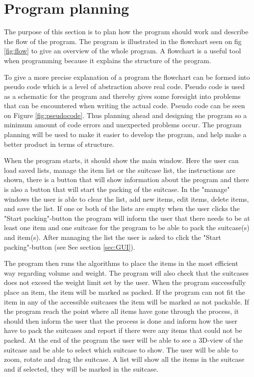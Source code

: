 \section{Program planning}
The purpose of this section is to plan how the program should work and describe the flow of the program. The program is illustrated in the flowchart seen on fig \ref{fig:flow} to give an overview of the whole program. A flowchart is a useful tool when programming because it explains the structure of the program.

To give a more precise explanation of a program the flowchart can be formed into pseudo code which is a level of abstraction above real code. Pseudo code is used as a schematic for the program and thereby gives some foresight into problems that can be encountered when writing the actual code. Pseudo code can be seen on Figure \ref{fig:pseudocode}.
Thus planning ahead and designing the program so a minimum amount of code errors and unexpected problems occur. The program planning will be used to make it easier to develop the program, and help make a better product in terms of structure.

When the program starts, it should show the main window. Here the user can load saved lists, manage the item list or the suitcase list, the instructions are shown, there is a button that will show information about the program and there is also a button that will start the packing of the suitcase. In the "manage" windows the user is able to clear the list, add new items, edit items, delete items, and save the list. If one or both of the lists are empty when the user clicks the "Start packing"-button the program will inform the user that there needs to be at least one item and one suitcase for the program to be able to pack the suitcase(s) and item(s). After managing the list the user is asked to click the "Start packing"-button (see See section \ref{sec:GUI}).

The program then runs the algorithms to place the items in the most efficient way regarding volume and weight. The program will also check that the suitcases does not exceed the weight limit set by the user.
When the program successfully place an item, the item will be marked as packed. If the program can not fit the item in any of the accessible suitcases the item will be marked as not packable. If the program reach the point where all items have gone through the process, it should then inform the user that the process is done and inform how the user have to pack the suitcases and report if there were any items that could not be packed.
At the end of the program the user will be able to see a 3D-view of the suitcase and be able to select which suitcase to show. The user will be able to zoom, rotate and drag the suitcase. A list will show all the items in the suitcase and if selected, they will be marked in the suitcase.

